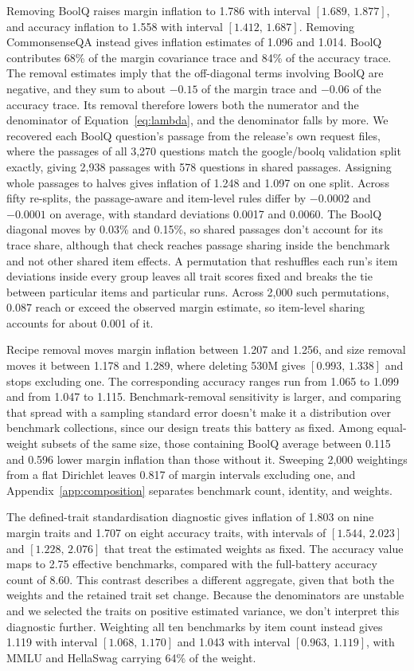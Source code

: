 \documentclass{article}
\newcommand{\ci}[2]{\ensuremath{[#1,\,#2]}}
\begin{document}
Removing BoolQ raises margin inflation to 1.786 with interval \ci{1.689}{1.877}, and accuracy inflation to 1.558 with interval \ci{1.412}{1.687}. Removing CommonsenseQA instead gives inflation estimates of 1.096 and 1.014. BoolQ contributes 68\% of the margin covariance trace and 84\% of the accuracy trace. The removal estimates imply that the off-diagonal terms involving BoolQ are negative, and they sum to about $-0.15$ of the margin trace and $-0.06$ of the accuracy trace. Its removal therefore lowers both the numerator and the denominator of Equation~\ref{eq:lambda}, and the denominator falls by more. We recovered each BoolQ question's passage from the release's own request files, where the passages of all 3,270 questions match the google/boolq validation split exactly, giving 2,938 passages with 578 questions in shared passages. Assigning whole passages to halves gives inflation of 1.248 and 1.097 on one split. Across fifty re-splits, the passage-aware and item-level rules differ by $-0.0002$ and $-0.0001$ on average, with standard deviations 0.0017 and 0.0060. The BoolQ diagonal moves by 0.03\% and 0.15\%, so shared passages don't account for its trace share, although that check reaches passage sharing inside the benchmark and not other shared item effects. A permutation that reshuffles each run's item deviations inside every group leaves all trait scores fixed and breaks the tie between particular items and particular runs. Across 2,000 such permutations, 0.087 reach or exceed the observed margin estimate, so item-level sharing accounts for about 0.001 of it.

Recipe removal moves margin inflation between 1.207 and 1.256, and size removal moves it between 1.178 and 1.289, where deleting 530M gives \ci{0.993}{1.338} and stops excluding one. The corresponding accuracy ranges run from 1.065 to 1.099 and from 1.047 to 1.115. Benchmark-removal sensitivity is larger, and comparing that spread with a sampling standard error doesn't make it a distribution over benchmark collections, since our design treats this battery as fixed. Among equal-weight subsets of the same size, those containing BoolQ average between 0.115 and 0.596 lower margin inflation than those without it. Sweeping 2,000 weightings from a flat Dirichlet leaves 0.817 of margin intervals excluding one, and Appendix~\ref{app:composition} separates benchmark count, identity, and weights.

The defined-trait standardisation diagnostic gives inflation of 1.803 on nine margin traits and 1.707 on eight accuracy traits, with intervals of \ci{1.544}{2.023} and \ci{1.228}{2.076} that treat the estimated weights as fixed. The accuracy value maps to 2.75 effective benchmarks, compared with the full-battery accuracy count of 8.60. This contrast describes a different aggregate, given that both the weights and the retained trait set change. Because the denominators are unstable and we selected the traits on positive estimated variance, we don't interpret this diagnostic further. Weighting all ten benchmarks by item count instead gives 1.119 with interval \ci{1.068}{1.170} and 1.043 with interval \ci{0.963}{1.119}, with MMLU and HellaSwag carrying 64\% of the weight.
\end{document}
